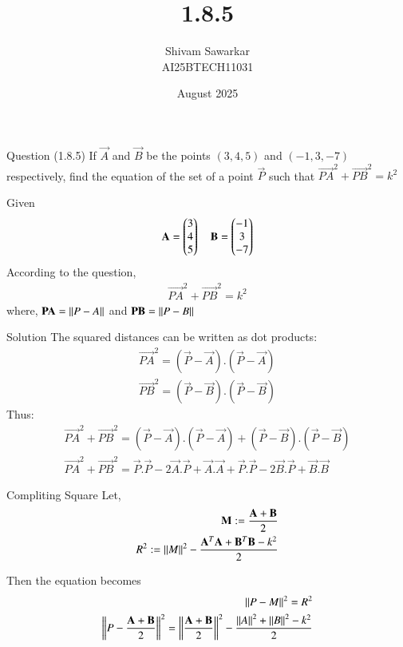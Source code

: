 \documentclass{beamer}
\title %
{1.8.5}
\date{August  2025}
\author %
{Shivam Sawarkar \\ AI25BTECH11031}
\begin{document}
\frame{\titlepage}
\begin{frame}{Question (1.8.5)}
If $\vec{A}$ and $\vec{B}$ be the points $(3,4,5)$ and $(-1,3,-7)$ respectively, find the equation of the set of a point $\vec{P}$ such that $\vec{PA}^2+\vec{PB}^2=k^2$
\end{frame}

\begin{frame}{Given}
    \begin{align}
    \mathbf{A}=\begin{pmatrix}3 \\ 4 \\ 5\end{pmatrix} \quad \mathbf{B}=\begin{pmatrix}-1 \\ 3 \\ -7\end{pmatrix}
\end{align}
According to the question,  
\begin{align}
    \vec{PA}^2+\vec{PB}^2=k^2
\end{align}
where, $\mathbf{PA}=\left\lVert P-A\right\rVert$ and $\mathbf{PB}=\left\lVert P-B\right\rVert$
\end{frame}

\begin{frame}{Solution}
    The squared distances can be written as dot products:
\begin{align}
    \vec{PA}^2=(\vec{P}-\vec{A}).(\vec{P}-\vec{A}) \\
    \vec{PB}^2=(\vec{P}-\vec{B}).(\vec{P}-\vec{B})
\end{align}
Thus:
\begin{align}
    \vec{PA}^2+\vec{PB}^2=(\vec{P}-\vec{A}).(\vec{P}-\vec{A})+(\vec{P}-\vec{B}).(\vec{P}-\vec{B}) \\
    \vec{PA}^2+\vec{PB}^2=\vec{P}.\vec{P}-2\vec{A}.\vec{P}+\vec{A}.\vec{A}+\vec{P}.\vec{P}-2\vec{B}.\vec{P}+\vec{B}.\vec{B}
\end{align}
\end{frame}

\begin{frame}{Compliting Square}
    Let, \\ 
\begin{align}
    \mathbf{M}:=\frac{\mathbf{A}+\mathbf{B}}{2} \\ 
    R^2:=\left\lVert M\right\rVert^2-\frac{\mathbf{A}^T\mathbf{A}+\mathbf{B}^T\mathbf{B}-k^2}{2}
\end{align}

Then the equation becomes\\ 
\begin{align}
    \left\lVert P-M\right\rVert^2=R^2 \\ 
    \left\lVert P-\frac{\mathbf{A}+\mathbf{B}}{2}\right\rVert^2=\left\lVert\frac{\mathbf{A}+\mathbf{B}}{2}\right\rVert^2-\frac{\left\lVert A\right\rVert^2+\left\lVert B\right\rVert^2-k^2}{2}
\end{align}
\end{frame}
\end{document}
